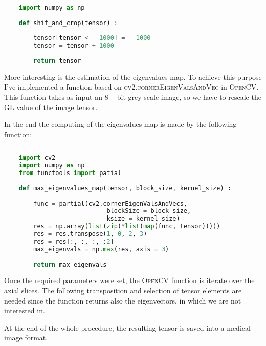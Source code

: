 \documentclass{standalone}
\begin{document}
	\lstset{style=python}
	\begin{lstlisting}[language=python, caption=HU registering function, label=code:saf]
		
	import numpy as np
		
	def shif_and_crop(tensor) :
		
		tensor[tensor <  -1000] = - 1000
		tensor = tensor + 1000
	
		return tensor
	\end{lstlisting}

	More interesting is the estimation of the eigenvalues map. To achieve this purpose I've implemented a function based on \textsc{cv2.cornerEigenValsAndVec} in \textsc{OpenCV}. This function takes as input an $8-$bit grey scale image, so we have to rescale the GL value of the image tensor. 

	In the end the computing of the eigenvalues map is made by the following function: 
		\lstset{style=python}
	\begin{lstlisting}[language=python, caption=maximum eigenvaleus map, label=code:saf]
		
	import cv2
	import numpy as np
	from functools import patial
		
	def max_eigenvalues_map(tensor, block_size, kernel_size) :
		
		func = partial(cv2.cornerEigenValsAndVecs, 
							blockSize = block_size, 
							ksize = kernel_size)
		res = np.array(list(zip(*list(map(func, tensor)))))
		res = res.transpose(1, 0, 2, 3)
		res = res[:, :, :, :2]
		max_eigenvals = np.max(res, axis = 3)
	
		return max_eigenvals

	\end{lstlisting}

	Once the required parameters were set, the \textsc{OpenCV} function is iterate over the axial slices. The following transposition and selection of tensor elements are needed since the function returns also the eigenvectors, in which we are not interested in. 

	At the end of the whole procedure, the resulting tensor is saved into a medical image format. 
\end{document}
